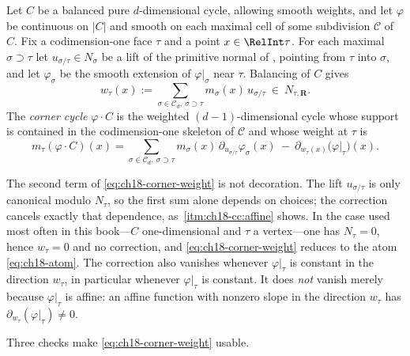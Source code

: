 \begin{definition}
\label{def:ch18-corner-cycle}
%
Let $C$ be a balanced pure $d$-dimensional cycle, allowing smooth weights,
and let $\varphi$
be continuous on $|C|$ and smooth on each maximal cell of some subdivision
$\mathscr C$ of $C$.  Fix a codimension-one face $\tau$ and a point
$x\in\RelInt\tau$.  For each maximal $\sigma\supset\tau$ let
$u_{\sigma/\tau}\in N_\sigma$ be a lift of the primitive normal of
, pointing from $\tau$ into $\sigma$, and let
$\varphi_\sigma$ be the smooth extension of $\varphi|_\sigma$ near $\tau$.
Balancing of $C$ gives
\begin{equation}
\label{eq:ch18-corner-defect}
 w_\tau(x):=\sum_{\sigma\in\mathscr C_d,\ \sigma\supset\tau}
   m_\sigma(x)\,u_{\sigma/\tau}\ \in\ N_{\tau,\mathbf R} .
\end{equation}
The \emph{corner cycle} $\varphi\cdot C$ is the weighted
$(d-1)$-dimensional cycle whose support is contained in the codimension-one
skeleton of $\mathscr C$ and whose weight at $\tau$ is
\begin{equation}
\label{eq:ch18-corner-weight}
 m_\tau(\varphi\cdot C)(x)
 =\sum_{\sigma\in\mathscr C_d,\ \sigma\supset\tau}
   m_\sigma(x)\,\partial_{u_{\sigma/\tau}}\varphi_\sigma(x)
   \ -\ \partial_{w_\tau(x)}\bigl(\varphi|_\tau\bigr)(x) .
\end{equation}
\end{definition}

\begin{remark}
\label{rem:ch18-corner-correction}
The second term of \eqref{eq:ch18-corner-weight} is not decoration.  The
lift $u_{\sigma/\tau}$ is only canonical modulo $N_\tau$, so the first sum
alone depends on choices; the correction cancels exactly that dependence,
as \,\cref{itm:ch18-cc:affine} shows.  In
the case used most often in this book---$C$ one-dimensional and $\tau$ a
vertex---one has $N_\tau=0$, hence $w_\tau=0$ and no correction, and
\eqref{eq:ch18-corner-weight} reduces to the atom \eqref{eq:ch18-atom}.  The
correction also vanishes whenever $\varphi|_\tau$ is constant in the
direction $w_\tau$, in particular whenever $\varphi|_\tau$ is constant.  It
does \emph{not} vanish merely because $\varphi|_\tau$ is affine: an affine
function with nonzero slope in the direction $w_\tau$ has
$\partial_{w_\tau}(\varphi|_\tau)\neq0$.
\end{remark}

Three checks make \eqref{eq:ch18-corner-weight} usable.

